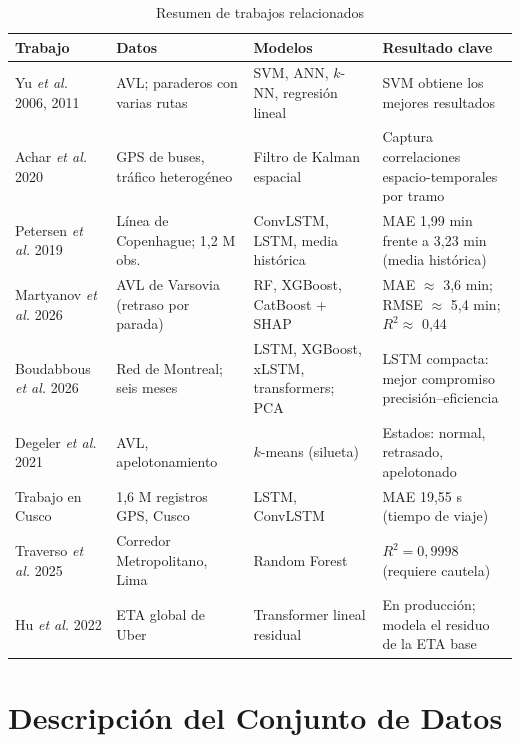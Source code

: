 \documentclass[conference,spanish]{IEEEtran}
\begin{document}
\begin{table}[t]
\centering
\caption{Resumen de trabajos relacionados}
\label{tab:sota}
\footnotesize
\begin{tabular}{@{}p{3.4cm}p{4.3cm}p{4.0cm}p{4.9cm}@{}}
\toprule
\textbf{Trabajo} & \textbf{Datos} & \textbf{Modelos} & \textbf{Resultado clave}\\
\midrule
Yu \textit{et al.} 2006, 2011 \cite{yu2006,yu2011} & AVL; paraderos con varias rutas & SVM, ANN, $k$-NN, regresión lineal & SVM obtiene los mejores resultados\\
Achar \textit{et al.} 2020 \cite{achar2020} & GPS de buses, tráfico heterogéneo & Filtro de Kalman espacial & Captura correlaciones espacio-temporales por tramo\\
Petersen \textit{et al.} 2019 \cite{petersen2019} & Línea de Copenhague; 1,2 M obs. & ConvLSTM, LSTM, media histórica & MAE 1,99 min frente a 3,23 min (media histórica)\\
Martyanov \textit{et al.} 2026 \cite{martyanov2026} & AVL de Varsovia (retraso por parada) & RF, XGBoost, CatBoost + SHAP & MAE $\approx$ 3,6 min; RMSE $\approx$ 5,4 min; $R^2\approx$ 0,44\\
Boudabbous \textit{et al.} 2026 \cite{boudabbous2026} & Red de Montreal; seis meses & LSTM, XGBoost, xLSTM, transformers; PCA & LSTM compacta: mejor compromiso precisión--eficiencia\\
Degeler \textit{et al.} 2021 \cite{degeler2021} & AVL, apelotonamiento & $k$-means (silueta) & Estados: normal, retrasado, apelotonado\\
Trabajo en Cusco \cite{cusco2024} & 1,6 M registros GPS, Cusco & LSTM, ConvLSTM & MAE 19,55 s (tiempo de viaje)\\
Traverso \textit{et al.} 2025 \cite{traverso2025} & Corredor Metropolitano, Lima & Random Forest & $R^2=0{,}9998$ (requiere cautela)\\
Hu \textit{et al.} 2022 \cite{hu2022deepreta} & ETA global de Uber & Transformer lineal residual & En producción; modela el residuo de la ETA base\\
\bottomrule
\end{tabular}
\end{table}

\section{Descripción del Conjunto de Datos}
\end{document}
